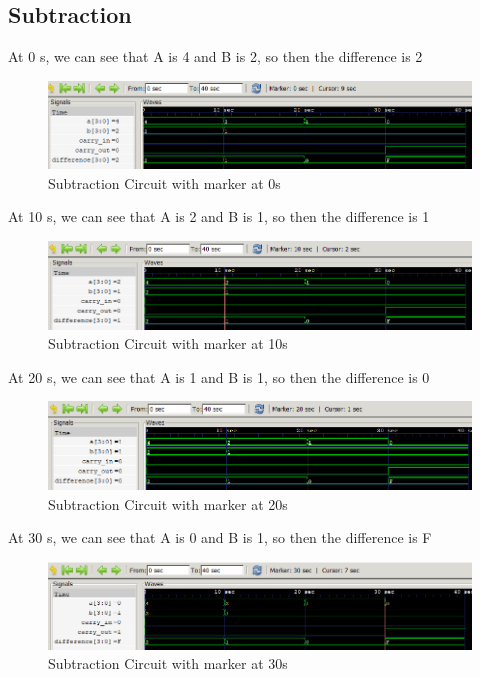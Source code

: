 \documentclass[12pt]{article}
\begin{document}
\subsection{Subtraction}

At 0 s, we can see that A is 4 and B is 2, so then the difference is 2
\begin{figure}[h]
    \centering
    \includegraphics[width = 1.0\textwidth]{figs/Sub0.png}
    \caption{Subtraction Circuit with marker at 0s}
    \label{fig:enter-label}
\end{figure}

At 10 s, we can see that A is 2 and B is 1, so then the difference is 1
\begin{figure}[h]
    \centering
    \includegraphics[width = 1.0\textwidth]{figs/Sub10.png}
    \caption{Subtraction Circuit with marker at 10s}
    \label{fig:enter-label}
\end{figure}

\newpage

At 20 s, we can see that A is 1 and B is 1, so then the difference is 0
\begin{figure}[h]
    \centering
    \includegraphics[width = 1.0\textwidth]{figs/Sub20.png}
    \caption{Subtraction Circuit with marker at 20s}
    \label{fig:enter-label}
\end{figure}

At 30 s, we can see that A is 0 and B is 1, so then the difference is F
\begin{figure}[h]
    \centering
    \includegraphics[width = 1.0\textwidth]{figs/Sub30.png}
    \caption{Subtraction Circuit with marker at 30s}
    \label{fig:enter-label}
\end{figure}
\end{document}
